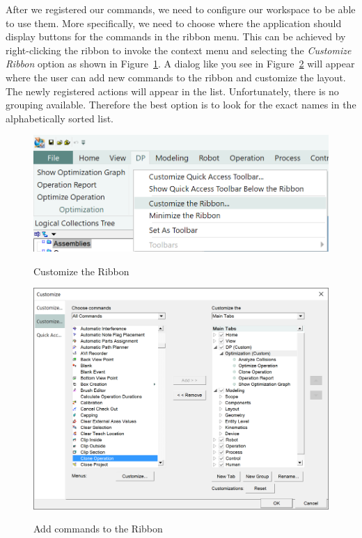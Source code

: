 After we registered our commands, we need to configure our workspace to be able to use them. More specifically, we need to choose where the application should display buttons for the commands in the ribbon menu. This can be achieved by right-clicking the ribbon to invoke the context menu and selecting the \emph{Customize Ribbon} option as shown in Figure~\ref{fig:CustomizeRibbonContextMenu}. A dialog like you see in Figure~\ref{fig:CustomizeRibbonDialog} will appear where the user can add new commands to the ribbon and customize the layout. The newly registered actions will appear in the list. Unfortunately, there is no grouping available. Therefore the best option is to look for the exact names in the alphabetically sorted list.

\begin{figure}[H]
    \caption{Customize the Ribbon}
    \centering
    \includegraphics{customizeribbon}
    \label{fig:CustomizeRibbonContextMenu}
\end{figure}

\begin{figure}[H]
    \caption{Add commands to the Ribbon}
    \centering
    \includegraphics[width=\textwidth]{addcommands}
    \label{fig:CustomizeRibbonDialog}
\end{figure}

